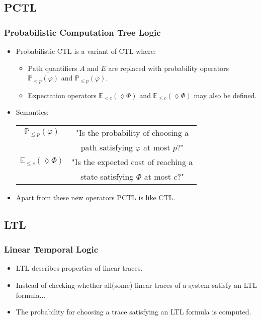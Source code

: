 \documentclass[handout]{beamer}
\begin{document}
\subsection{PCTL}
\begin{frame}
\frametitle{Probabilistic Computation Tree Logic}
\begin{itemize}
\item Probabilistic CTL is a variant of CTL where:
\begin{itemize}
\item Path quantifiers \(A\) and \(E\) are replaced with probability operators \(\mathbb{P}_{<p}(\varphi)\) and \(\mathbb{P}_{\leq p}(\varphi)\).
\item Expectation operators \(\mathbb{E}_{<c}(\lozenge\Phi)\) and \(\mathbb{E}_{\leq c}(\lozenge\Phi)\) may also be defined.
\end{itemize}
\item Semantics:\\\vspace{3mm}
\begin{tabular}{cc}
\(\mathbb{P}_{\leq p}(\varphi)\) & "Is the probability of choosing a \\ & path satisfying \(\varphi\) at most \(p\)?" \vspace{2mm}\\
\(\mathbb{E}_{\leq c}(\lozenge\Phi)\) & "Is the expected cost of reaching a \\ & state satisfying \(\Phi\) at most \(c\)?"
\end{tabular}
\item Apart from these new operators PCTL is like CTL.
\end{itemize}
\end{frame}

\subsection{LTL}
\begin{frame}
\frametitle{Linear Temporal Logic}
\begin{itemize}
\item LTL describes properties of linear traces.
\item Instead of checking whether all(some) linear traces of a system satisfy an LTL formula...
\item The probability for choosing a trace satisfying an LTL formula is computed.
\end{itemize}
\end{frame}
\end{document}
